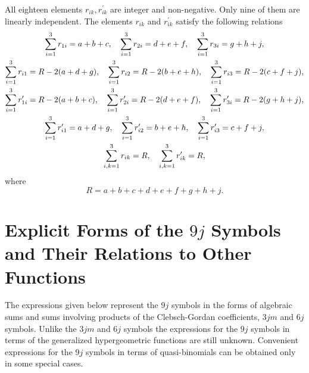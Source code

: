 All eighteen elements $r_{i k}, r_{i k}^{\prime}$ are integer and non-negative. Only nine of them are linearly independent. The
elements $r_{i k}$ and $r_{i k}^{\prime}$ satisfy the following relations
\begin{gather}
\sum_{i=1}^{3} r_{1 i}=a+b+c, \quad \sum_{i=1}^{3} r_{2 i}=d+e+f, \quad \sum_{i=1}^{3} r_{3 i}=g+h+j,  \notag\\
\sum_{i=1}^{3} r_{i 1}=R-2(a+d+g), \quad \sum_{i=1}^{3} r_{i 2}=R-2(b+e+h), \quad \sum_{i=1}^{3} r_{i 3}=R-2(c+f+j),  \notag\\
\sum_{i=1}^{3} r_{1 i}^{\prime}=R-2(a+b+c), \quad \sum_{i=1}^{3} r_{2 i}^{\prime}=R-2(d+e+f), \quad \sum_{i=1}^{3} r_{3 i}^{\prime}=R-2(g+h+j),  \label{eq:10:1:14}\\
\sum_{i=1}^{3} r_{i 1}^{\prime}=a+d+g, \quad \sum_{i=1}^{3} r_{i 2}^{\prime}=b+e+h, \quad \sum_{i=1}^{3} r_{i 3}^{\prime}=c+f+j,  \notag\\
\sum_{i, k=1}^{3} r_{i k}=R, \quad \sum_{i, k=1}^{3} r_{i k}^{\prime}=R, \notag
\end{gather}
where
\begin{equation}
R=a+b+c+d+e+f+g+h+j . \label{eq:10:1:15}
\end{equation}
\section{Explicit Forms of the $9 j$ Symbols and Their Relations to Other Functions}\label{sec:10.2}
The expressions given below represent the $9 j$ symbols in the forms of algebraic sums and sums involving products of the Clebsch-Gordan coefficients, $3 j m$ and $6 j$ symbols. Unlike the $3 j m$ and $6 j$ symbols the expressions for the $9 j$ symbols in terms of the generalized hypergeometric functions are still unknown. Convenient expressions for the $9 j$ symbols in terms of quasi-binomials can be obtained only in some special cases.\\
